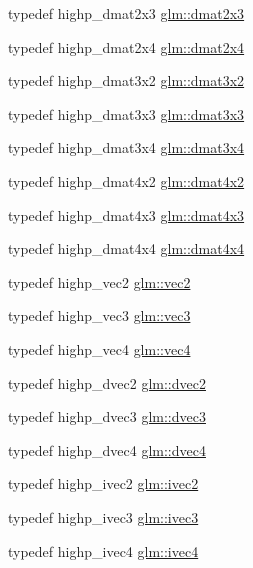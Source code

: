 \begin{DoxyCompactItemize}
\item 
typedef highp\-\_\-dmat2x3 \hyperlink{group__core__types_ga6b5ff9888ca0e468f35b637d4c3a361d}{glm\-::dmat2x3}
\item 
typedef highp\-\_\-dmat2x4 \hyperlink{group__core__types_ga2d1dd4b4925d1ea67539902c820483a0}{glm\-::dmat2x4}
\item 
typedef highp\-\_\-dmat3x2 \hyperlink{group__core__types_ga2db259d2e7921065c5b7d4dca9547960}{glm\-::dmat3x2}
\item 
typedef highp\-\_\-dmat3x3 \hyperlink{group__core__types_gaf3c29c4f75a448f308463e75ca2efd4c}{glm\-::dmat3x3}
\item 
typedef highp\-\_\-dmat3x4 \hyperlink{group__core__types_ga19e745a83cba85f57afa1232276dcc96}{glm\-::dmat3x4}
\item 
typedef highp\-\_\-dmat4x2 \hyperlink{group__core__types_gab3d51ce41e6f0aa267d3e185cee09c44}{glm\-::dmat4x2}
\item 
typedef highp\-\_\-dmat4x3 \hyperlink{group__core__types_gaa4a157ac183c5bd5dcbd555a94b1b505}{glm\-::dmat4x3}
\item 
typedef highp\-\_\-dmat4x4 \hyperlink{group__core__types_ga54d90d4b902d93638b906571af215bb1}{glm\-::dmat4x4}
\item 
typedef highp\-\_\-vec2 \hyperlink{group__core__types_gaa1618f51db67eaa145db101d8c8431d8}{glm\-::vec2}
\item 
typedef highp\-\_\-vec3 \hyperlink{group__core__types_ga1c47e8b3386109bc992b6c48e91b0be7}{glm\-::vec3}
\item 
typedef highp\-\_\-vec4 \hyperlink{group__core__types_ga5881b1b022d7fd1b7218f5916532dd02}{glm\-::vec4}
\item 
typedef highp\-\_\-dvec2 \hyperlink{group__core__types_gae6727259898288cae197724d5f172b3b}{glm\-::dvec2}
\item 
typedef highp\-\_\-dvec3 \hyperlink{group__core__types_ga7f3287f952e6ccb481231368091702ac}{glm\-::dvec3}
\item 
typedef highp\-\_\-dvec4 \hyperlink{group__core__types_ga0824ceed7ec3b2fba89765501c1540b5}{glm\-::dvec4}
\item 
typedef highp\-\_\-ivec2 \hyperlink{group__core__types_ga9e6ce9cfc7919976b318197e18d8a065}{glm\-::ivec2}
\item 
typedef highp\-\_\-ivec3 \hyperlink{group__core__types_ga6e12a4ca00d696f07da1df4eb73e0fe8}{glm\-::ivec3}
\item 
typedef highp\-\_\-ivec4 \hyperlink{group__core__types_gaa4560ddc50320ea8f8a70d5c9c249fea}{glm\-::ivec4}

\end{DoxyCompactItemize}
